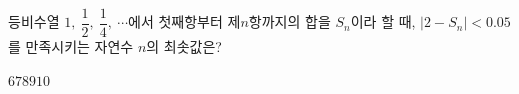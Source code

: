 등비수열 $1,\ \dfrac{1}{2},\ \dfrac{1}{4},\ \cdots$에서 첫째항부터 제$n$항까지의 합을 $S_n$이라 할 때, $|2-S_n|<0.05$를 만족시키는 자연수 $n$의 최솟값은?
\begin{choices32}{$6$}{$7$}{$8$}{$9$}{$10$}\end{choices32}
